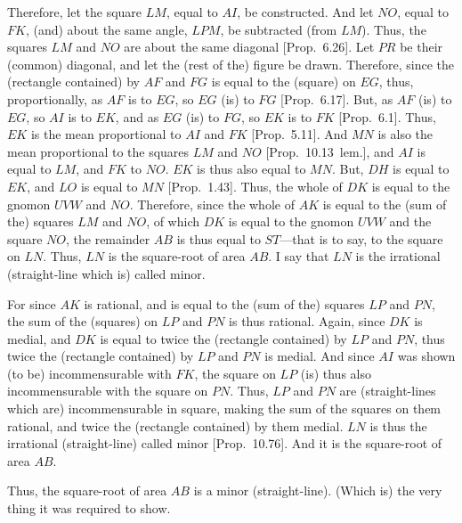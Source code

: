 \begin{Parallel}{}{}
{\epsfysize=1.3in
\centerline{}

Therefore, let the square $LM$, equal  to $AI$, be constructed. And let $NO$, equal to $FK$, (and) about the same angle, $LPM$,  be subtracted (from $LM$). Thus, the squares $LM$ and $NO$ are about the
same diagonal [Prop.~6.26]. Let $PR$ be their (common) diagonal, and let the (rest of the) figure be drawn. Therefore, since
the (rectangle contained) by $AF$ and $FG$ is equal to the (square) on $EG$, thus, proportionally, as $AF$ is to $EG$, so $EG$ (is) to $FG$
[Prop.~6.17]. 
But, as $AF$ (is) to $EG$, so
$AI$ is to $EK$, and as $EG$ (is) to $FG$, so $EK$ is to $FK$ [Prop.~6.1]. Thus, $EK$ is the mean proportional to
$AI$ and $FK$ [Prop.~5.11]. And $MN$ is also the mean proportional to the squares $LM$
and $NO$ [Prop.~10.13~lem.], and $AI$ is equal to $LM$, and $FK$ to $NO$. $EK$ is thus also equal to $MN$. But, $DH$ is equal to $EK$, and $LO$ is equal to $MN$ [Prop.~1.43]. 
Thus, the whole of $DK$ is equal to the gnomon $UVW$ and $NO$.
Therefore, since the whole of $AK$ is equal to the (sum of the) squares $LM$ and
$NO$, of which $DK$ is equal to the gnomon $UVW$ and the square
$NO$, the remainder $AB$ is thus equal to $ST$---that is to say, to the
square on $LN$. Thus, $LN$ is the square-root of area $AB$. I say
that $LN$ is the irrational (straight-line which is) called minor.

For since $AK$ is rational, and is equal to the (sum of the) squares $LP$ and $PN$,
the sum of the (squares) on $LP$ and $PN$ is thus rational. Again, since
$DK$ is medial, and $DK$ is equal to twice the (rectangle contained)
by $LP$ and $PN$, thus twice the (rectangle contained) by $LP$
and $PN$ is medial. And since $AI$ was shown (to be) incommensurable
with $FK$, the square on $LP$ (is) thus also incommensurable with
the square on $PN$. Thus, $LP$ and $PN$ are (straight-lines which are) incommensurable in square,
making the sum of the squares on them rational, and twice the (rectangle
contained) by them medial. $LN$ is thus the irrational (straight-line)
called minor [Prop.~10.76]. And it is
the square-root of area $AB$.

Thus, the square-root of area $AB$ is a minor (straight-line). (Which is)
the very thing it was required to show.}
\end{Parallel}

